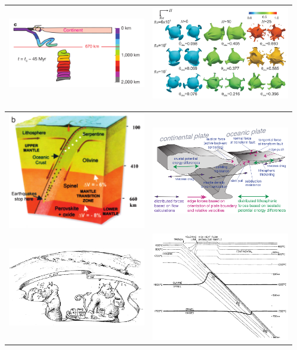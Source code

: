 \begin{tabular}{p{8cm}p{8cm}}
\includegraphics[width=6cm]{images/beautiful/simi13} \cite{simi13} &
\includegraphics[width=6cm]{images/beautiful/oflb13} \cite{oflb13} \\ \hline
\end{tabular}


\begin{tabular}{p{8cm}p{8cm}}
\includegraphics[width=6cm]{images/beautiful/gree07} \cite{gree07} &
\includegraphics[width=6cm]{images/beautiful/beoc01} \cite{beoc01} \\
\includegraphics[width=6cm]{images/beautiful/hovo77} \cite{hovo77} &
\includegraphics[width=6cm]{images/beautiful/scyt75} \cite{scyt75} 
\end{tabular}

\begin{center}
\end{center}
